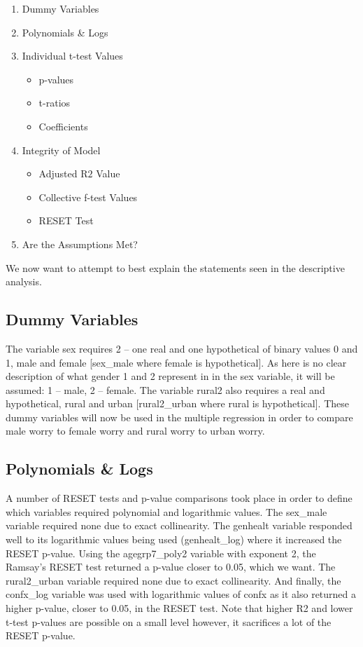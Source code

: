 \documentclass[11pt, english]{article}
\begin{document}
	\begin{enumerate}
	\setlength\itemsep{0cm}
		\item Dummy Variables
		\item Polynomials \& Logs
		\item Individual t-test Values
		\begin{itemize}
			\item p-values
			\item t-ratios
			\item Coefficients
		\end{itemize}
		\item Integrity of Model
		\begin{itemize}
			\item Adjusted R$2$ Value
			\item Collective f-test Values
			\item RESET Test
		\end{itemize}
		\item Are the Assumptions Met?
	\end{enumerate}

	We now want to attempt to best explain the statements seen in the descriptive analysis.\\

	\subsection{Dummy Variables}

	The variable sex requires 2 – one real and one hypothetical of binary values 0 and 1, male and female [sex\_male where female is hypothetical]. As here is no clear description of what gender 1 and 2 represent in in the sex variable, it will be assumed: 1 – male, 2 – female. The variable rural2 also requires a real and hypothetical, rural and urban [rural2\_urban where rural is hypothetical]. These dummy variables will now be used in the multiple regression in order to compare male worry to female worry and rural worry to urban worry.

	\subsection{Polynomials \& Logs}

	A number of RESET tests and p-value comparisons took place in order to define which variables required polynomial and logarithmic values. The sex\_male variable required none due to exact collinearity. The genhealt variable responded well to its logarithmic values being used (genhealt\_log) where it increased the RESET p-value. Using the agegrp7\_poly2 variable with exponent 2, the Ramsay’s RESET test returned a p-value closer to 0.05, which we want. The rural2\_urban variable required none due to exact collinearity. And finally, the confx\_log variable was used with logarithmic values of confx as it also returned a higher p-value, closer to 0.05, in the RESET test. Note that higher R2 and lower t-test p-values are possible on a small level however, it sacrifices a lot of the RESET p-value.\\
\end{document}
